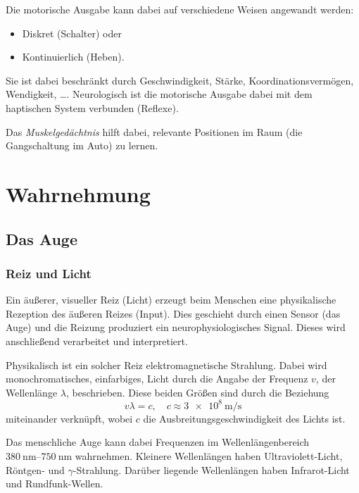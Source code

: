 				Die motorische Ausgabe kann dabei auf verschiedene Weisen angewandt werden:
				\begin{itemize}
					\item Diskret (Schalter) oder
					\item Kontinuierlich (Heben).
				\end{itemize}
				Sie ist dabei beschränkt durch Geschwindigkeit, Stärke, Koordinationsvermögen, Wendigkeit, \dots. Neurologisch ist die motorische Ausgabe dabei mit dem haptischen System verbunden (Reflexe).
				
				Das \emph{Muskelgedächtnis} hilft dabei, relevante Positionen im Raum (\zB die Gangschaltung im Auto) zu lernen.

	\section{Wahrnehmung}
		\subsection{Das Auge}
			\subsubsection{Reiz und Licht}
				Ein äußerer, visueller Reiz (Licht) erzeugt beim Menschen eine physikalische Rezeption des äußeren Reizes (Input). Dies geschieht durch einen Sensor (\bspw das Auge) und die Reizung produziert ein neurophysiologisches Signal. Dieses wird anschließend verarbeitet und interpretiert.
				
				Physikalisch ist ein solcher Reiz elektromagnetische Strahlung. Dabei wird monochromatisches, \dh einfarbiges, Licht durch die Angabe der Frequenz \(v\), \bzw der Wellenlänge \(\lambda\), beschrieben. Diese beiden Größen sind durch die Beziehung
				\begin{equation*}
					v \lambda = c, \quad c \approx \SI{3e8}{\meter\per\second}
				\end{equation*}
				miteinander verknüpft, wobei \(c\) die Ausbreitungsgeschwindigkeit des Lichts ist.
				
				Das menschliche Auge kann dabei Frequenzen im Wellenlängenbereich \( \SIrange{380}{750}{\nano\meter} \) wahrnehmen. Kleinere Wellenlängen haben \zB Ultraviolett-Licht, Röntgen- und \(\gamma\)-Strahlung. Darüber liegende Wellenlängen haben \zB Infrarot-Licht und Rundfunk-Wellen.

